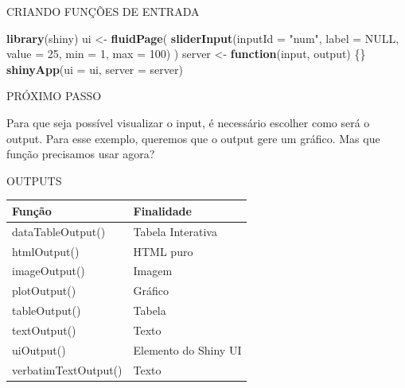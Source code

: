 \documentclass[
  ignorenonframetext,
]{beamer}
\newenvironment{Shaded}{\begin{snugshade}}{\end{snugshade}}
\newcommand{\ControlFlowTok}[1]{\textcolor[rgb]{0.13,0.29,0.53}{\textbf{#1}}}
\newcommand{\DataTypeTok}[1]{\textcolor[rgb]{0.13,0.29,0.53}{#1}}
\newcommand{\DecValTok}[1]{\textcolor[rgb]{0.00,0.00,0.81}{#1}}
\newcommand{\KeywordTok}[1]{\textcolor[rgb]{0.13,0.29,0.53}{\textbf{#1}}}
\newcommand{\NormalTok}[1]{#1}
\newcommand{\OtherTok}[1]{\textcolor[rgb]{0.56,0.35,0.01}{#1}}
\newcommand{\StringTok}[1]{\textcolor[rgb]{0.31,0.60,0.02}{#1}}
\begin{document}
\begin{frame}[fragile]{CRIANDO FUNÇÕES DE ENTRADA}
\protect\hypertarget{criando-funcoes-de-entrada}{}


\begin{Shaded}
\begin{Highlighting}[]
\KeywordTok{library}\NormalTok{(shiny)}
\NormalTok{ui <-}\StringTok{ }\KeywordTok{fluidPage}\NormalTok{(}
  \KeywordTok{sliderInput}\NormalTok{(}\DataTypeTok{inputId =} \StringTok{"num"}\NormalTok{,}
              \DataTypeTok{label =} \OtherTok{NULL}\NormalTok{,}
              \DataTypeTok{value =} \DecValTok{25}\NormalTok{, }\DataTypeTok{min =} \DecValTok{1}\NormalTok{, }\DataTypeTok{max =} \DecValTok{100}\NormalTok{) )}
\NormalTok{server <-}\StringTok{ }\ControlFlowTok{function}\NormalTok{(input, output) \{\}}
\KeywordTok{shinyApp}\NormalTok{(}\DataTypeTok{ui =}\NormalTok{ ui, }\DataTypeTok{server =}\NormalTok{ server)}
\end{Highlighting}
\end{Shaded}

\end{frame}

\begin{frame}{PRÓXIMO PASSO}
\protect\hypertarget{proximo-passo}{}

\begin{center}
Para que seja possível \alert{visualizar} o input, é necessário escolher como será o \alert{output.}
Para esse exemplo, queremos que o output gere um \alert{gráfico.}
Mas que \alert{função} precisamos usar agora?
\end{center}

\end{frame}

\begin{frame}{OUTPUTS}
\protect\hypertarget{outputs}{}

\begin{table}
\begin{tabular}{l | l}
Função & Finalidade \\
\hline \hline
dataTableOutput() &  Tabela Interativa \\
htmlOutput() & HTML puro \\ 
imageOutput() & Imagem \\
plotOutput() & Gráfico \\
tableOutput() & Tabela \\
textOutput() & Texto \\
uiOutput() & Elemento do Shiny UI \\
verbatimTextOutput() & Texto \\
\end{tabular}
\end{table}

\end{frame}
\end{document}
